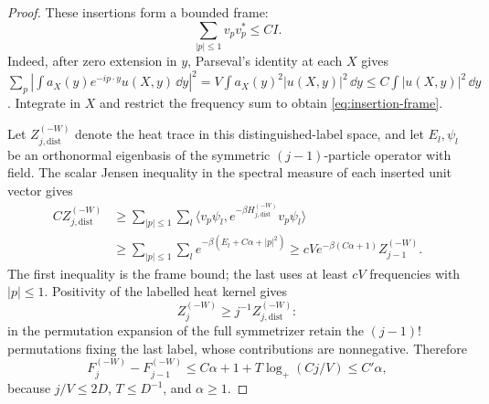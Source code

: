 \begin{proof}
These insertions form a bounded frame:
\begin{equation}\label{eq:insertion-frame}
 \sum_{|p|\le1}v_pv_p^*\le CI.
\end{equation}
Indeed, after zero extension in $y$, Parseval's identity at each $X$
gives
$\sum_p|\int a_X(y)e^{-ip\cdot y}u(X,y)\,\dd y|^2
=V\int a_X(y)^2|u(X,y)|^2\,\dd y\le C\int|u(X,y)|^2\,\dd y$.
Integrate in $X$ and restrict the frequency sum to obtain
\eqref{eq:insertion-frame}.

Let $Z_{j,\mathrm{dist}}^{(-W)}$ denote the heat trace in this
distinguished-label space, and let $E_l,\psi_l$ be an orthonormal
eigenbasis of the symmetric $(j-1)$-particle operator with field.
The scalar Jensen inequality in the spectral measure of each inserted
unit vector gives
\[
 \begin{split}
 C Z_{j,\mathrm{dist}}^{(-W)}
 &\ge\sum_{|p|\le1}\sum_l
 \langle v_p\psi_l,e^{-\beta H_{j,\mathrm{dist}}^{(-W)}}v_p\psi_l\rangle\\
 &\ge\sum_{|p|\le1}\sum_l e^{-\beta(E_l+C\alpha+|p|^2)}
 \ge cV e^{-\beta(C\alpha+1)} Z_{j-1}^{(-W)}.
 \end{split}
\]
The first inequality is the frame bound; the last uses at least $cV$
frequencies with $|p|\le1$. Positivity of the labelled heat kernel
gives
\[
 Z_j^{(-W)}\ge j^{-1}Z_{j,\mathrm{dist}}^{(-W)}:
\]
in the permutation expansion of the full symmetrizer retain the
$(j-1)!$ permutations fixing the last label, whose contributions are
nonnegative. Therefore
\[
 F_j^{(-W)}-F_{j-1}^{(-W)}
 \le C\alpha+1+T\log_+(Cj/V)\le C'\alpha,
\]
because $j/V\le2D$, $T\le D^{-1}$, and $\alpha\ge1$.
\end{proof}
